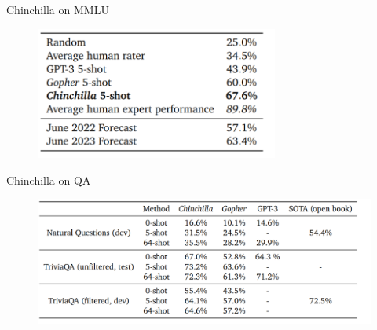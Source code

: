 
\begin{vbframe}{Chinchilla on MMLU}

\vfill

\begin{figure}
	\centering
	\includegraphics[width = 8cm]{./figure/chinchilla_mmlu.png} \\ 
\end{figure}

\vfill

\end{vbframe}


\begin{vbframe}{Chinchilla on QA}

\vfill

\begin{figure}
	\centering
	\includegraphics[width = 12cm]{./figure/chinchilla_qa.png} \\ 
\end{figure}

\vfill

\end{vbframe}


\endlecture


